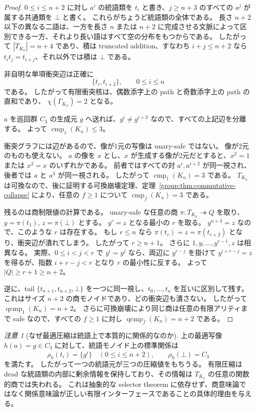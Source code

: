 \documentclass[10pt,a4paper]{ltjsarticle}
\theoremstyle{definition}
\theoremstyle{remark}
\newtheorem{remark}[theorem]{注意}
\newcommand{\cmp}{\operatorname{cmp}}
\newcommand{\qcmp}{\operatorname{qcmp}}
\begin{document}
\begin{proof}
$0\le i\le n+2$ に対し $a^i$ の統語類を $t_i$ と書き、$j\ge n+3$ のすべての $a^j$ が属する共通類を $\bot$ と書く。
これらがちょうど統語類の全体である。
長さ $n+2$ 以下の異なる二語は、一方を長さ $n$ または $n+2$ に完成させる文脈によって区別できる一方、それより長い語はすべて空の分布をもつからである。
したがって $|T_{K_n}|=n+4$ であり、積は truncated addition、すなわち $i+j\le n+2$ なら
$t_it_j=t_{i+j}$、それ以外では積は $\bot$ である。

非自明な単項衝突辺は正確に
\[
\{t_i,t_{i+2}\},
\qquad 0\le i\le n
\]
である。
したがって有限衝突核は、偶数添字上の path と奇数添字上の path の直和であり、
$\chi(\Gamma_{K_n})=2$ となる。

$a$ を巡回群 $C_3$ の生成元 $g$ へ送れば、$g^i\ne g^{i+2}$ なので、すべての上記辺を分離する。
よって $\cmp_1(K_n)\le3$。

衝突グラフには辺があるので、像が1元の写像は unary-safe ではない。
像が2元のものも使えない。
$a$ の像を $x$ とし、$x$ が生成する像が2元だとすると、$x^2=1$ または $x^2=x$ のいずれかである。
前者ではすべての対 $a^i,a^{i+2}$ が同一視され、後者では $a$ と $a^3$ が同一視される。
したがって $\cmp_1(K_n)=3$ である。
$T_{K_n}$ は可換なので、後に証明する可換崩壊定理、定理~\ref{group:thm:commutative-collapse} により、任意の $f\ge1$ について
$\cmp_f(K_n)=3$ である。

残るのは商制限値の計算である。
unary-safe な任意の商
$\pi:T_{K_n}\twoheadrightarrow Q$
を取り、$y=\pi(t_1)$, $z=\pi(\bot)$ とする。
$y^r=z$ となる最小の $r$ を取る。
$y^{n+3}=z$ なので、このような $r$ は存在する。
もし $r\le n$ なら
$\pi(t_r)=z=\pi(t_{r+2})$
となり、衝突辺が潰れてしまう。
したがって $r\ge n+1$。
さらに
$1,y,\ldots,y^{r-1},z$
は相異なる。
実際、$0\le i<j<r$ で $y^i=y^j$ なら、両辺に $y^{r-j}$ を掛けて
$y^{i+r-j}=z$
を得るが、指数 $i+r-j<r$ となり $r$ の最小性に反する。
よって
$|Q|\ge r+1\ge n+2$。

逆に、tail
$\{t_{n+1},t_{n+2},\bot\}$
を一つに同一視し、$t_0,\ldots,t_n$ を互いに区別して残す。
これはサイズ $n+2$ の商モノイドであり、どの衝突辺も潰さない。
したがって
$\qcmp_1(K_n)=n+2$。
さらに可換崩壊により同じ商は任意の有限アリティまで safe なので、すべての $f\ge1$ に対し
$\qcmp_f(K_n)=n+2$ である。
\end{proof}

\begin{remark}[なぜ最適圧縮は統語上で本質的に関係的なのか]
\label{conf:rem:genuinely-relational}
上の最適写像 $h(a)=g\in C_3$ に対して、統語モノイド上の標準関係は
\[
\rho_h(t_i)=\{g^i\}\quad(0\le i\le n+2),
\qquad
\rho_h(\bot)=C_3
\]
を満たす。
したがって一つの統語元が三つの圧縮値をもちうる。
有限圧縮は dead な統語類の内部に剰余情報を保持しており、その情報は $T_{K_n}$ の任意の関数的商では失われる。
これは抽象的な selector theorem に依存せず、商意味論ではなく関係意味論が正しい有限インターフェースであることの具体的理由を与える。
\end{remark}
\end{document}
